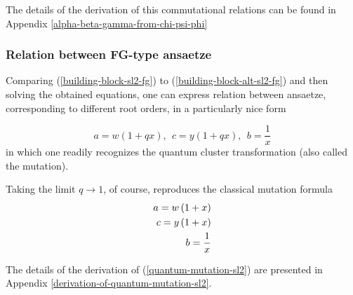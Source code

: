 \documentclass{article}
\newcommand{\lb}{\left (}
\newcommand{\rb}{\right )}
\newcommand {\?}{\textit{???}}
\def\classlim{q \rightarrow 1}
\newcommand{\delabel}[1]{(\ref{#1})}
\begin{document}
The details of the derivation of this commutational relations
can be found in Appendix \ref{alpha-beta-gamma-from-chi-psi-phi}

\subsubsection{Relation between FG-type ansaetze}
Comparing \delabel{building-block-sl2-fg} to \delabel{building-block-alt-sl2-fg} and then
solving the obtained equations, one can express relation between
ansaetze, corresponding to different root orders, in a particularly nice form

\begin{equation}
\label{quantum-mutation-sl2}
  \boxed{
    a = w (1 + q x),\ \ c = y(1 + q x), \ \ b = \frac{1}{x}
  }
\end{equation}
in which one readily recognizes the quantum cluster transformation (also called the mutation).

Taking the limit $\classlim$, of course, reproduces the classical mutation formula
\begin{align}
\label{classical-mutation-sl2}
\notag a = w \lb 1 + x\rb \\
c = y \lb 1 + x\rb \\
b = \frac{1}{x} \notag
\end{align}

The details of the derivation of \delabel{quantum-mutation-sl2} are presented in Appendix
\ref{derivation-of-quantum-mutation-sl2}.



\end{document}

